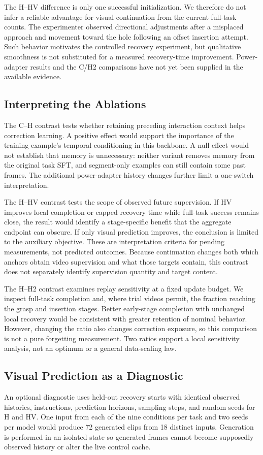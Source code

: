 \documentclass[letterpaper,10pt,conference]{ieeeconf}
\begin{document}
The H--HV difference is only one successful initialization. We therefore do not infer a reliable advantage for visual continuation from the current full-task counts. The experimenter observed directional adjustments after a misplaced approach and movement toward the hole following an offset insertion attempt. Such behavior motivates the controlled recovery experiment, but qualitative smoothness is not substituted for a measured recovery-time improvement. Power-adapter results and the C/H2 comparisons have not yet been supplied in the available evidence.

\subsection{Interpreting the Ablations}
The C--H contrast tests whether retaining preceding interaction context helps correction learning. A positive effect would support the importance of the training example's temporal conditioning in this backbone. A null effect would not establish that memory is unnecessary: neither variant removes memory from the original task SFT, and segment-only examples can still contain some past frames. The additional power-adapter history changes further limit a one-switch interpretation.

The H--HV contrast tests the scope of observed future supervision. If HV improves local completion or capped recovery time while full-task success remains close, the result would identify a stage-specific benefit that the aggregate endpoint can obscure. If only visual prediction improves, the conclusion is limited to the auxiliary objective. These are interpretation criteria for pending measurements, not predicted outcomes. Because continuation changes both which anchors obtain video supervision and what those targets contain, this contrast does not separately identify supervision quantity and target content.

The H--H2 contrast examines replay sensitivity at a fixed update budget. We inspect full-task completion and, where trial videos permit, the fraction reaching the grasp and insertion stages. Better early-stage completion with unchanged local recovery would be consistent with greater retention of nominal behavior. However, changing the ratio also changes correction exposure, so this comparison is not a pure forgetting measurement. Two ratios support a local sensitivity analysis, not an optimum or a general data-scaling law.

\subsection{Visual Prediction as a Diagnostic}
An optional diagnostic uses held-out recovery starts with identical observed histories, instructions, prediction horizons, sampling steps, and random seeds for H and HV. One input from each of the nine conditions per task and two seeds per model would produce 72 generated clips from 18 distinct inputs. Generation is performed in an isolated state so generated frames cannot become supposedly observed history or alter the live control cache.
\end{document}
